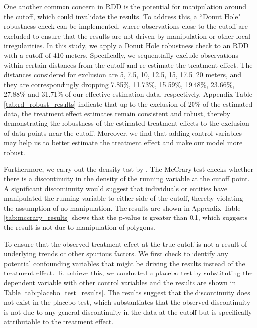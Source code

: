 \documentclass[11pt]{article}
\begin{document}
One another common concern in RDD is the potential for manipulation around the cutoff, which could invalidate the results. To address this, a ``Donut Hole" robustness check can be implemented, where observations close to the cutoff are excluded to ensure that the results are not driven by manipulation or other local irregularities. In this study, we apply a Donut Hole robustness check to an RDD with a cutoff of 410 meters. Specifically, we sequentially exclude observations within certain distances from the cutoff and re-estimate the treatment effect. The distances considered for exclusion are 5, 7.5, 10, 12.5, 15, 17.5, 20 meters, and they are correspondingly dropping 7.85\%, 11.73\%, 15.59\%, 19.48\%, 23.66\%, 27.88\% and 31.71\% of our effective estimation data, respectively. Appendix Table \ref{tab:rd_robust_results} indicate that up to the exclusion of 20\% of the estimated data, the treatment effect estimates remain consistent and robust, thereby demonstrating the robustness of the estimated treatment effects to the exclusion of data points near the cutoff. Moreover, we find that adding control variables may help us to better estimate the treatment effect and make our model more robust.

Furthermore, we carry out the density test by \citep{MCCRARY2008698}. The McCrary test checks whether there is a discontinuity in the density of the running variable at the cutoff point. A significant discontinuity would suggest that individuals or entities have manipulated the running variable to either side of the cutoff, thereby violating the assumption of no manipulation. The results are shown in Appendix Table \ref{tab:mccrary_results} shows that the p-value is greater than 0.1, which suggests the result is not due to manipulation of polygons.

To ensure that the observed treatment effect at the true cutoff is not a result of underlying trends or other spurious factors. We first check to identify any potential confounding variables that might be driving the results instead of the treatment effect. To achieve this, we conducted a placebo test by substituting the dependent variable with other control variables and the results are shown in Table \ref{tab:placebo_test_results}. The results suggest that the discontinuity does not exist in the placebo test, which substantiates that the observed discontinuity is not due to any general discontinuity in the data at the cutoff but is specifically attributable to the treatment effect.
\end{document}
